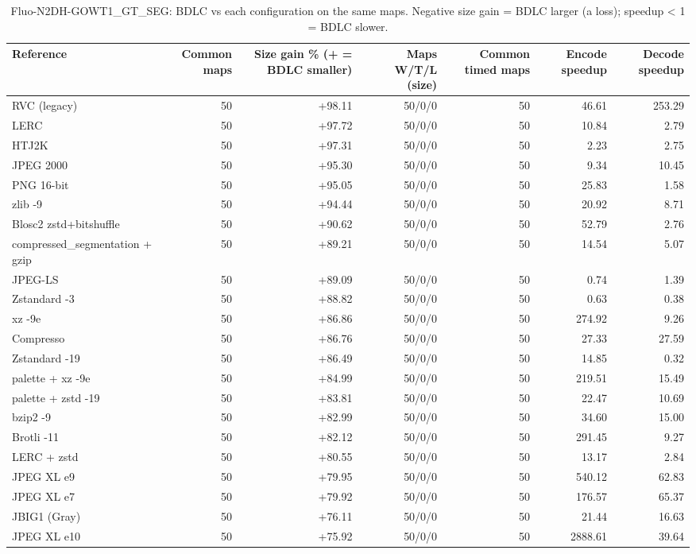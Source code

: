 \begin{table}[t]
\centering
\caption{Fluo-N2DH-GOWT1\_GT\_SEG: BDLC vs each configuration on the same maps. Negative size gain = BDLC larger (a loss); speedup < 1 = BDLC slower.}
\begin{tabular}{lrrrrrr}
\hline
Reference & Common maps & Size gain \% (+ = BDLC smaller) & Maps W/T/L (size) & Common timed maps & Encode speedup & Decode speedup \\
\hline
RVC (legacy) & 50 & +98.11 & 50/0/0 & 50 & 46.61 & 253.29 \\
LERC & 50 & +97.72 & 50/0/0 & 50 & 10.84 & 2.79 \\
HTJ2K & 50 & +97.31 & 50/0/0 & 50 & 2.23 & 2.75 \\
JPEG 2000 & 50 & +95.30 & 50/0/0 & 50 & 9.34 & 10.45 \\
PNG 16-bit & 50 & +95.05 & 50/0/0 & 50 & 25.83 & 1.58 \\
zlib -9 & 50 & +94.44 & 50/0/0 & 50 & 20.92 & 8.71 \\
Blosc2 zstd+bitshuffle & 50 & +90.62 & 50/0/0 & 50 & 52.79 & 2.76 \\
compressed\_segmentation + gzip & 50 & +89.21 & 50/0/0 & 50 & 14.54 & 5.07 \\
JPEG-LS & 50 & +89.09 & 50/0/0 & 50 & 0.74 & 1.39 \\
Zstandard -3 & 50 & +88.82 & 50/0/0 & 50 & 0.63 & 0.38 \\
xz -9e & 50 & +86.86 & 50/0/0 & 50 & 274.92 & 9.26 \\
Compresso & 50 & +86.76 & 50/0/0 & 50 & 27.33 & 27.59 \\
Zstandard -19 & 50 & +86.49 & 50/0/0 & 50 & 14.85 & 0.32 \\
palette + xz -9e & 50 & +84.99 & 50/0/0 & 50 & 219.51 & 15.49 \\
palette + zstd -19 & 50 & +83.81 & 50/0/0 & 50 & 22.47 & 10.69 \\
bzip2 -9 & 50 & +82.99 & 50/0/0 & 50 & 34.60 & 15.00 \\
Brotli -11 & 50 & +82.12 & 50/0/0 & 50 & 291.45 & 9.27 \\
LERC + zstd & 50 & +80.55 & 50/0/0 & 50 & 13.17 & 2.84 \\
JPEG XL e9 & 50 & +79.95 & 50/0/0 & 50 & 540.12 & 62.83 \\
JPEG XL e7 & 50 & +79.92 & 50/0/0 & 50 & 176.57 & 65.37 \\
JBIG1 (Gray) & 50 & +76.11 & 50/0/0 & 50 & 21.44 & 16.63 \\
JPEG XL e10 & 50 & +75.92 & 50/0/0 & 50 & 2888.61 & 39.64 \\

\end{tabular}
\end{table}
